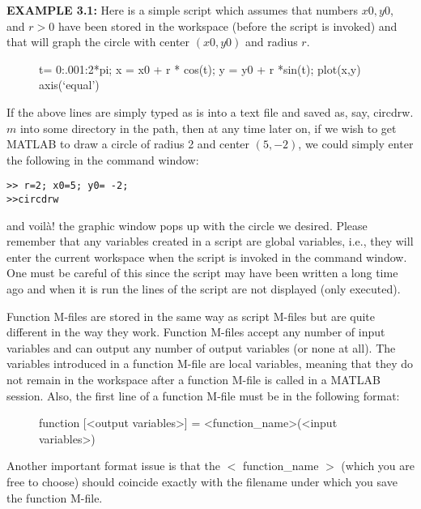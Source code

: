 \documentclass[../main.tex]{subfiles}
\begin{document}
\textbf{EXAMPLE 3.1:} Here is a simple script which assumes that numbers $x 0, y 0$, and $r>0$ have been stored in the workspace (before the script is invoked) and that will graph the circle with center $(x 0, y 0)$ and radius $r$.

\begin{figure}[H]
\centering
\begin{boxedverbatim}
t= 0:.001:2*pi;
x = x0 + r * cos(t);
y = y0 + r *sin(t);
plot(x,y)
axis(`equal')
\end{boxedverbatim}
\end{figure}

If the above lines are simply typed as is into a text file and saved as, say, circdrw. $m$ into some directory in the path, then at any time later on, if we wish to get MATLAB to draw a circle of radius 2 and center $(5,-2)$, we could simply enter the following in the command window:

\begin{verbatim}
>> r=2; x0=5; y0= -2;
>>circdrw 

\end{verbatim}

and voilà! the graphic window pops up with the circle we desired. Please remember that any variables created in a script are global variables, i.e., they will enter the current workspace when the script is invoked in the command window. One must be careful of this since the script may have been written a long time ago and when it is run the lines of the script are not displayed (only executed).

Function M-files are stored in the same way as script M-files but are quite different in the way they work. Function M-files accept any number of input variables and can output any number of output variables (or none at all). The variables introduced in a function M-file are local variables, meaning that they do not remain in the workspace after a function M-file is called in a MATLAB session. Also, the first line of a function M-file must be in the following format:

\begin{figure}[H]
\centering
\begin{boxedverbatim}
function [<output variables>] = <function_name>(<input variables>)
\end{boxedverbatim}
\end{figure}

Another important format issue is that the $<$ function\_name $>$ (which you are free to choose) should coincide exactly with the filename under which you save the function M-file.\\
\end{document}
